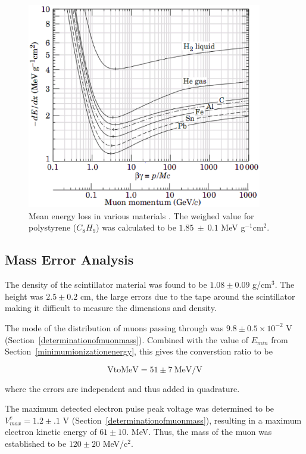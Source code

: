 \label{energy_loss}
\begin{figure}[h]
\begin{center}
\includegraphics[height = 90mm]{figures/energy_loss.eps}
\caption{\small{Mean energy loss in various materials \cite{yao}. The
weighed value for polystyrene ($C_8H_9$) was calculated to be
$1.85~\pm~0.1$ MeV g$^{-1}$cm$^{2}$}.}
\label{figure:dEdx}
\end{center}
\end{figure}

\subsection{Mass Error Analysis}

The density of the scintillator material was found to be $1.08 \pm
0.09$ g/cm$^3$. The height was $2.5 \pm 0.2$ cm, the large errors due
to the tape around the scintillator making it difficult to measure the
dimensions and density.

The mode of the distribution of muons passing through was $9.8 \pm 0.5
\times 10^{-2}$ V (Section~\ref{determinationofmuonmass}). Combined
with the value of $E_{min}$ from Section~\ref{minimumionizationenergy},
this gives the converstion ratio to be

\begin{equation} \mathrm{VtoMeV} = 51 \pm 7~\mathrm{ MeV/V} \end{equation}   

where the errors are independent and thus added in quadrature.

The maximum detected electron pulse peak voltage was determined to be
$V_{max}^e = 1.2 \pm .1$ V (Section~\ref{determinationofmuonmass}),
resulting in a maximum electron kinetic energy of $61\pm 10.$
MeV. Thus, the mass of the muon was established to be $120 \pm 20$
MeV/c$^{2}$.
